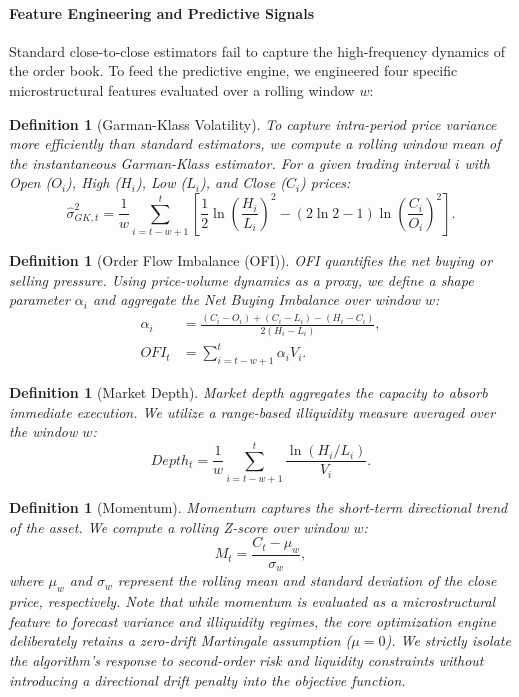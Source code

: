 \documentclass[11pt,a4paper]{article}
\newtheorem{definition}[theorem]{Definition}
\begin{document}
\paragraph{Feature Engineering and Predictive Signals}
Standard close-to-close estimators fail to capture the high-frequency dynamics of the order book. To feed the predictive engine, we engineered four specific microstructural features evaluated over a rolling window $w$:

\begin{definition}[Garman-Klass Volatility]
To capture intra-period price variance more efficiently than standard estimators, we compute a rolling window mean of the instantaneous Garman-Klass estimator. For a given trading interval $i$ with Open ($O_i$), High ($H_i$), Low ($L_i$), and Close ($C_i$) prices:
\[ \hat{\sigma}_{GK, t}^2 = \frac{1}{w} \sum_{i=t-w+1}^{t} \left[ \frac{1}{2} \ln\left(\frac{H_i}{L_i}\right)^2 - (2\ln 2 - 1) \ln\left(\frac{C_i}{O_i}\right)^2 \right]. \]
\end{definition}

\begin{definition}[Order Flow Imbalance (OFI)]
OFI quantifies the net buying or selling pressure. Using price-volume dynamics as a proxy, we define a shape parameter $\alpha_i$ and aggregate the Net Buying Imbalance over window $w$:
\begin{align*}
\alpha_i &= \frac{(C_i - O_i) + (C_i - L_i) - (H_i - C_i)}{2(H_i - L_i)}, \\
OFI_t &= \sum_{i=t-w+1}^{t} \alpha_i V_i.
\end{align*}
\end{definition}

\begin{definition}[Market Depth]
Market depth aggregates the capacity to absorb immediate execution. We utilize a range-based illiquidity measure averaged over the window $w$:
\[ Depth_t = \frac{1}{w} \sum_{i=t-w+1}^{t} \frac{\ln(H_i / L_i)}{V_i}. \]
\end{definition}

\begin{definition}[Momentum]
Momentum captures the short-term directional trend of the asset. We compute a rolling Z-score over window $w$:
\[ M_t = \frac{C_t - \mu_w}{\sigma_w}, \]
where $\mu_w$ and $\sigma_w$ represent the rolling mean and standard deviation of the close price, respectively. Note that while momentum is evaluated as a microstructural feature to forecast variance and illiquidity regimes, the core optimization engine deliberately retains a zero-drift Martingale assumption ($\mu=0$). We strictly isolate the algorithm's response to second-order risk and liquidity constraints without introducing a directional drift penalty into the objective function.
\end{definition}
\end{document}
